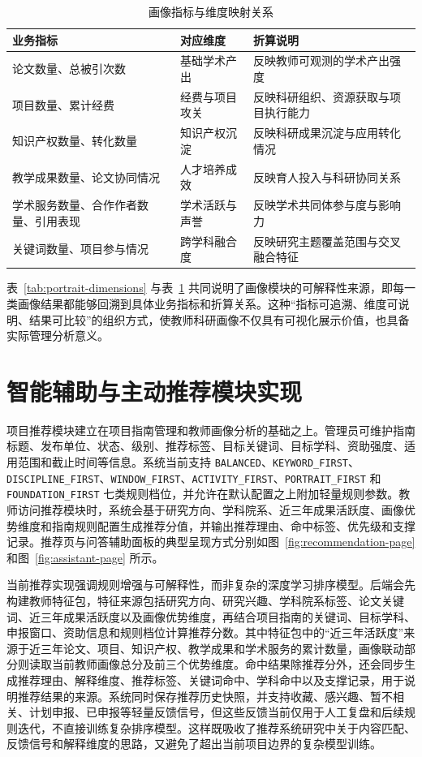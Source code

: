 \documentclass[12pt,a4paper]{ctexbook}
\begin{document}
\begin{table}[H]
  \centering
  \caption{画像指标与维度映射关系}
  \label{tab:portrait-mapping}
  \begin{tabular}{p{3cm}p{3cm}p{5.3cm}}
    \toprule
    业务指标 & 对应维度 & 折算说明 \\
    \midrule
    论文数量、总被引次数 & 基础学术产出 & 反映教师可观测的学术产出强度 \\
    项目数量、累计经费 & 经费与项目攻关 & 反映科研组织、资源获取与项目执行能力 \\
    知识产权数量、转化数量 & 知识产权沉淀 & 反映科研成果沉淀与应用转化情况 \\
    教学成果数量、论文协同情况 & 人才培养成效 & 反映育人投入与科研协同关系 \\
    学术服务数量、合作作者数量、引用表现 & 学术活跃与声誉 & 反映学术共同体参与度与影响力 \\
    关键词数量、项目参与情况 & 跨学科融合度 & 反映研究主题覆盖范围与交叉融合特征 \\
    \bottomrule
  \end{tabular}
\end{table}

表~\ref{tab:portrait-dimensions} 与表~\ref{tab:portrait-mapping} 共同说明了画像模块的可解释性来源，即每一类画像结果都能够回溯到具体业务指标和折算关系。这种“指标可追溯、维度可说明、结果可比较”的组织方式，使教师科研画像不仅具有可视化展示价值，也具备实际管理分析意义。

\section{智能辅助与主动推荐模块实现}
项目推荐模块建立在项目指南管理和教师画像分析的基础之上。管理员可维护指南标题、发布单位、状态、级别、推荐标签、目标关键词、目标学科、资助强度、适用范围和截止时间等信息。系统当前支持 \texttt{BALANCED}、\texttt{KEYWORD\_FIRST}、\texttt{DISCIPLINE\_FIRST}、\texttt{WINDOW\_FIRST}、\texttt{ACTIVITY\_FIRST}、\texttt{PORTRAIT\_FIRST} 和 \texttt{FOUNDATION\_FIRST} 七类规则档位，并允许在默认配置之上附加轻量规则参数。教师访问推荐模块时，系统会基于研究方向、学科院系、近三年成果活跃度、画像优势维度和指南规则配置生成推荐分值，并输出推荐理由、命中标签、优先级和支撑记录。推荐页与问答辅助面板的典型呈现方式分别如图~\ref{fig:recommendation-page} 和图~\ref{fig:assistant-page} 所示。

当前推荐实现强调规则增强与可解释性，而非复杂的深度学习排序模型。后端会先构建教师特征包，特征来源包括研究方向、研究兴趣、学科院系标签、论文关键词、近三年成果活跃度以及画像优势维度，再结合项目指南的关键词、目标学科、申报窗口、资助信息和规则档位计算推荐分数。其中特征包中的“近三年活跃度”来源于近三年论文、项目、知识产权、教学成果和学术服务的累计数量，画像联动部分则读取当前教师画像总分及前三个优势维度。命中结果除推荐分外，还会同步生成推荐理由、解释维度、推荐标签、关键词命中、学科命中以及支撑记录，用于说明推荐结果的来源。系统同时保存推荐历史快照，并支持收藏、感兴趣、暂不相关、计划申报、已申报等轻量反馈信号，但这些反馈当前仅用于人工复盘和后续规则迭代，不直接训练复杂排序模型。这样既吸收了推荐系统研究中关于内容匹配、反馈信号和解释维度的思路，又避免了超出当前项目边界的复杂模型训练\cite{next_gen_recsys_2007}\cite{recsys_survey_cn_2022}。
\end{document}
